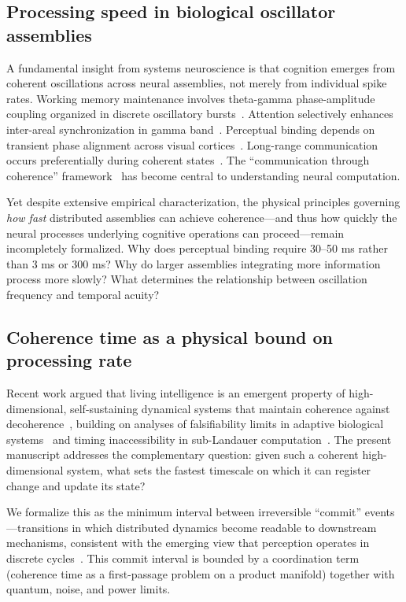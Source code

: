 \documentclass[12pt]{article}
\begin{document}
\subsection{Processing speed in biological oscillator assemblies}

A fundamental insight from systems neuroscience is that cognition emerges from coherent oscillations across neural assemblies, not merely from individual spike rates. Working memory maintenance involves theta-gamma phase-amplitude coupling organized in discrete oscillatory bursts~\cite{miller2018,lisman2013,lundqvist2016}. Attention selectively enhances inter-areal synchronization in gamma band~\cite{fries2015,womelsdorf2007}. Perceptual binding depends on transient phase alignment across visual cortices~\cite{singer1999,engel2001}. Long-range communication occurs preferentially during coherent states~\cite{varela2001}. The ``communication through coherence'' framework~\cite{fries2005} has become central to understanding neural computation.

Yet despite extensive empirical characterization, the physical principles governing \emph{how fast} distributed assemblies can achieve coherence---and thus how quickly the neural processes underlying cognitive operations can proceed---remain incompletely formalized. Why does perceptual binding require 30--50 ms rather than 3 ms or 300 ms? Why do larger assemblies integrating more information process more slowly? What determines the relationship between oscillation frequency and temporal acuity?

\subsection{Coherence time as a physical bound on processing rate}

Recent work argued that living intelligence is an emergent property of high-dimensional, self-sustaining dynamical systems that maintain coherence against decoherence~\cite{todd2025intelligence}, building on analyses of falsifiability limits in adaptive biological systems~\cite{todd2025biosystems} and timing inaccessibility in sub-Landauer computation~\cite{todd2025demon}. The present manuscript addresses the complementary question: given such a coherent high-dimensional system, what sets the fastest timescale on which it can register change and update its state?

We formalize this as the minimum interval between irreversible ``commit'' events---transitions in which distributed dynamics become readable to downstream mechanisms, consistent with the emerging view that perception operates in discrete cycles~\cite{vanrullen2016}. This commit interval is bounded by a coordination term (coherence time as a first-passage problem on a product manifold) together with quantum, noise, and power limits.
\end{document}
